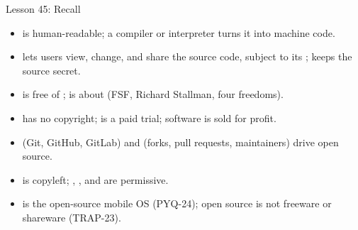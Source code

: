 \documentclass[aspectratio=169]{beamer}
\begin{document}
\begin{frame}{Lesson 45: Recall}
  \begin{itemize}
    \item {} is human-readable; a compiler or interpreter turns
      it into machine code.
    \item {} lets users view, change, and share the source code,
      subject to its ;  keeps the source secret.
    \item {} is free of ;  is about
       (FSF, Richard Stallman, four freedoms).
    \item {} has no copyright;  is a paid
      trial;  software is sold for profit.
    \item {} (Git, GitHub, GitLab) and  (forks, pull requests, maintainers) drive open source.
    \item {} is copyleft; , , and  are
      permissive.
    \item {} is the open-source mobile OS (PYQ-24); open source is
      not freeware or shareware (TRAP-23).
  \end{itemize}
\end{frame}
\end{document}
